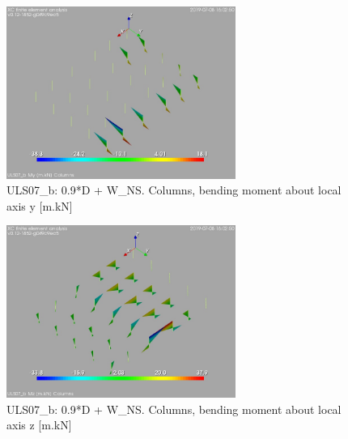 \begin{figure}
\begin{center}
\includegraphics[width=75mm]{annex_res_columns/graphics/resSimplLC/ULS07_bcolumnsMy}
\caption{ULS07\_b: 0.9*D + W\_NS. Columns, bending moment about local axis y [m.kN]}
\end{center}
\end{figure}
\begin{figure}
\begin{center}
\includegraphics[width=75mm]{annex_res_columns/graphics/resSimplLC/ULS07_bcolumnsMz}
\caption{ULS07\_b: 0.9*D + W\_NS. Columns, bending moment about local axis z [m.kN]}
\end{center}
\end{figure}

